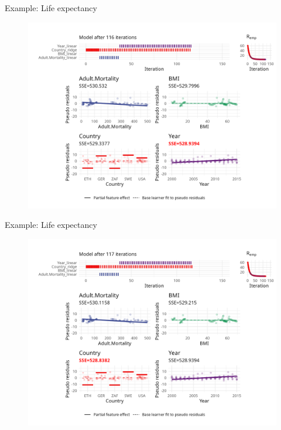 \begin{frame}{Example: Life expectancy}
	\begin{figure}
		\centering
		\includegraphics[width=\textwidth]{figure/cwb-anim/fig-iter-0116.png}
	\end{figure}
	\addtocounter{framenumber}{-1}
\end{frame}


\begin{frame}{Example: Life expectancy}
	\begin{figure}
		\centering
		\includegraphics[width=\textwidth]{figure/cwb-anim/fig-iter-0117.png}
	\end{figure}
	\addtocounter{framenumber}{-1}
\end{frame}



